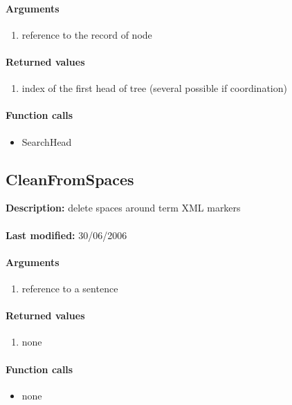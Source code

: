 \paragraph{Arguments}
\begin{enumerate}
\item reference to the record of node
\end{enumerate}

\paragraph{Returned values}
\begin{enumerate}
\item index of the first head of tree (several possible if coordination)
\end{enumerate}

\paragraph{Function calls}
\begin{itemize}
\item SearchHead
\end{itemize}

\subsection{CleanFromSpaces}
\textbf{Description:} delete spaces around term XML markers\\
\\\textbf{Last modified:} 30/06/2006

\paragraph{Arguments}
\begin{enumerate}
\item reference to a sentence
\end{enumerate}

\paragraph{Returned values}
\begin{enumerate}
\item none
\end{enumerate}

\paragraph{Function calls}
\begin{itemize}
\item none
\end{itemize}

